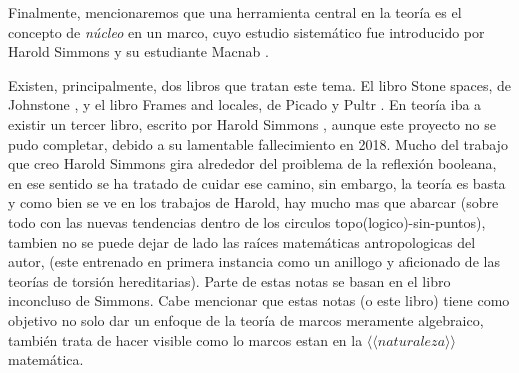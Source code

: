 Finalmente, mencionaremos que una herramienta central
en la teoría es el concepto de \emph{núcleo} en un marco,
cuyo estudio sistemático fue introducido por Harold Simmons \cite{simmons1978framework}
y su estudiante Macnab \cite{macnab198110}.

Existen, principalmente, dos libros que tratan este tema.
El libro Stone spaces, de Johnstone \cite{johnstone1986stone},
y el libro Frames and locales, de Picado y Pultr \cite{PicadoPultr}.
En teoría iba a existir un tercer libro, escrito por Harold Simmons ,
aunque este proyecto no se pudo completar, debido a su
lamentable fallecimiento en 2018. Mucho del trabajo que creo Harold Simmons 
gira alrededor del proiblema de la reflexión booleana, 
en ese sentido se ha tratado de cuidar ese camino, sin embargo, 
la teoría es basta y como bien se ve en los trabajos de Harold, 
hay mucho mas que abarcar (sobre todo con las nuevas tendencias dentro de los circulos topo(logico)-sin-puntos), 
tambien no se puede dejar de lado las raíces matemáticas antropologicas del autor, 
(este entrenado en primera instancia como un anillogo y aficionado de las teorías de torsión hereditarias).
Parte de estas notas se basan en el libro inconcluso de Simmons. 
Cabe mencionar que estas notas (o este libro) tiene como objetivo no solo dar un enfoque de la teoría de marcos 
meramente algebraico, también trata de hacer visible como lo marcos 
estan en la $\langle \langle naturaleza \rangle \rangle$ matemática. 



